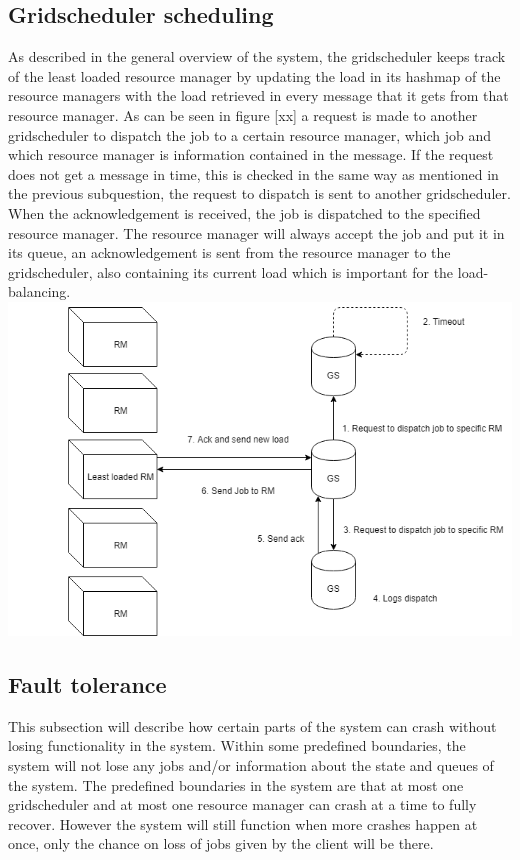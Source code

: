 \documentclass[a4paper]{article}
\begin{document}
\subsection{Gridscheduler scheduling}
As described in the general overview of the system, the gridscheduler keeps track of the least loaded resource manager by updating the load in its hashmap of the resource managers with the load retrieved in every message that it gets from 
that resource manager.
As can be seen in figure [xx] a request is made to another gridscheduler to dispatch the job to a certain resource manager, which job and which resource manager is information contained in the message.
If the request does not get a message in time, this is checked in the same way as mentioned in the previous subquestion, the request to dispatch is sent to another gridscheduler. 
When the acknowledgement is received, the job is dispatched to the specified resource manager.
The resource manager will always accept the job and put it in its queue, an acknowledgement is sent from the resource manager to the gridscheduler, also containing its current load which is important for the load-balancing.
\\
\includegraphics[scale=0.5]{design-gs-dispatch-job.png}


\subsection{Fault tolerance}
This subsection will describe how certain parts of the system can crash without losing functionality in the system.
Within some predefined boundaries, the system will not lose any jobs and/or information about the state and queues of the system.
The predefined boundaries in the system are that at most one gridscheduler and at most one resource manager can crash at a time to fully recover.
However the system will still function when more crashes happen at once, only the chance on loss of jobs given by the client will be there. \\
\end{document}
